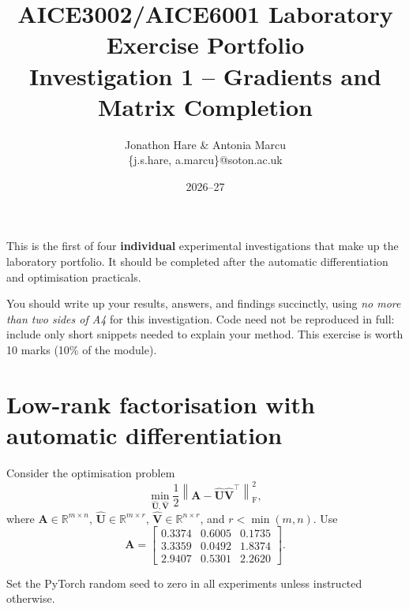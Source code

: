 \documentclass[a4paper]{article}
\begin{document}
\title{{\small AICE3002/AICE6001 Laboratory Exercise Portfolio}\\Investigation 1 -- Gradients and Matrix Completion}
\author{Jonathon Hare \& Antonia Marcu\\\{j.s.hare, a.marcu\}@soton.ac.uk}
\date{2026--27}
\maketitle

This is the first of four \textbf{individual} experimental investigations that make up the laboratory portfolio. It should be completed after the automatic differentiation and optimisation practicals. 

You should write up your results, answers, and findings succinctly, using \emph{no more than two sides of A4} for this investigation. Code need not be reproduced in full: include only short snippets needed to explain your method. This exercise is worth 10 marks (10\% of the module).

\section{Low-rank factorisation with automatic differentiation}

Consider the optimisation problem
\begin{equation}
    \min_{\hat{\bm U},\hat{\bm V}}
    \frac{1}{2}\left\lVert \bm A-\hat{\bm U}\hat{\bm V}^{\top}\right\rVert_{\mathrm F}^{2},
\end{equation}
where $\bm A\in\mathbb{R}^{m\times n}$, $\hat{\bm U}\in\mathbb{R}^{m\times r}$, $\hat{\bm V}\in\mathbb{R}^{n\times r}$, and $r<\min(m,n)$. Use
\begin{equation*}
\bm A=
\begin{bmatrix}
0.3374 & 0.6005 & 0.1735\\
3.3359 & 0.0492 & 1.8374\\
2.9407 & 0.5301 & 2.2620
\end{bmatrix}.
\end{equation*}

Set the PyTorch random seed to zero in all experiments unless instructed otherwise. 
\end{document}
